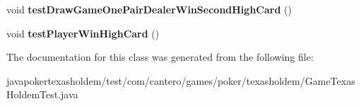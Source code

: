 \begin{DoxyCompactItemize}
\item 
\hypertarget{classcom_1_1cantero_1_1games_1_1poker_1_1texasholdem_1_1_game_texas_holdem_test_a2ccdebcf4ce7c2954fb63a900a63d4b7}{}void {\bfseries test\+Draw\+Game\+One\+Pair\+Dealer\+Win\+Second\+High\+Card} ()\label{classcom_1_1cantero_1_1games_1_1poker_1_1texasholdem_1_1_game_texas_holdem_test_a2ccdebcf4ce7c2954fb63a900a63d4b7}

\item 
\hypertarget{classcom_1_1cantero_1_1games_1_1poker_1_1texasholdem_1_1_game_texas_holdem_test_a2e512c5512e036303d11d42be4027c86}{}void {\bfseries test\+Player\+Win\+High\+Card} ()\label{classcom_1_1cantero_1_1games_1_1poker_1_1texasholdem_1_1_game_texas_holdem_test_a2e512c5512e036303d11d42be4027c86}

\end{DoxyCompactItemize}


The documentation for this class was generated from the following file\+:\begin{DoxyCompactItemize}
\item 
javapokertexasholdem/test/com/cantero/games/poker/texasholdem/Game\+Texas\+Holdem\+Test.\+java\end{DoxyCompactItemize}

